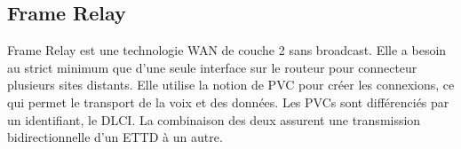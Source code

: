\subsection{Frame Relay}
Frame Relay est une technologie WAN de couche 2 sans broadcast.
Elle a besoin au strict minimum que d'une seule interface sur le routeur pour connecteur plusieurs sites distants.
Elle utilise la notion de PVC pour créer les connexions, ce qui permet le transport de la voix et des données.
Les PVCs sont différenciés par un identifiant, le DLCI.
La combinaison des deux assurent une transmission bidirectionnelle d'un ETTD à un autre.
